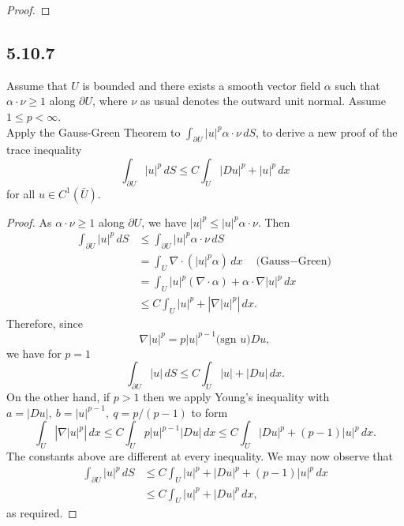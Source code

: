 \documentclass{article}
\begin{document}
\begin{flushleft}
\begin{proof}
\end{proof}
\subsection{\textbf{5.10.7}} Assume that $U$ is bounded and there exists a smooth vector field $\alpha$ such that $\alpha \cdot \nu \ge 1$ along $\partial U$, where $\nu$ as usual denotes the outward unit normal. Assume $1\le p < \infty$.
\\
Apply the Gauss-Green Theorem to $\int_{\partial U}|u|^p\alpha\cdot\nu\,dS$, to derive a new proof of the trace inequality
$$\int_{\partial U}|u|^p\,dS\le C\int_U|Du|^p+|u|^p\,dx$$
for all $u\in C^1(\bar{U})$.

\begin{proof}
As $\alpha \cdot \nu \ge 1$ along $\partial U$, we have $|u|^p \le |u|^p \alpha \cdot \nu$. Then
\begin{align*}
    \int_{\partial{U}}|u|^p\,dS &\le \int_{\partial{U}}|u|^p\alpha \cdot \nu\,dS\\&=
    \int_U \nabla\cdot (|u|^p\alpha)\,dx\quad\text{(Gauss$-$Green)}\\&=
    \int_U |u|^p(\nabla\cdot \alpha) + \alpha \cdot \nabla|u|^p\,dx\\&\le
    C\int_U |u|^p + \left|\nabla|u|^p\right|\,dx.
\end{align*}
Therefore, since 
$$\nabla|u|^p=p|u|^{p-1}\text{(sgn $u$)}Du,$$
we have for $p=1$
$$\int_{\partial{U}}|u|\,dS \le C\int_U |u| +|Du|\,dx.$$
On the other hand, if $p>1$ then we apply Young's inequality with $a=|Du|,~ b = |u|^{p-1},~ q=p/(p-1)$ to form
$$\int_U \left|\nabla|u|^p\right|\,dx \le C\int_U p|u|^{p-1}|Du|\,dx\le C\int_U |Du|^p + (p-1)|u|^p\,dx.$$
The constants above are different at every inequality. We may now observe that
\begin{align*}
   \int_{\partial{U}}|u|^p\,dS &\le  C\int_U |u|^p + |Du|^p + (p-1)|u|^p\,dx\\&\le
   C\int_U |u|^p + |Du|^p \,dx,
\end{align*}
as required.

\end{proof}

\end{flushleft}
\end{document}
